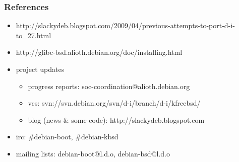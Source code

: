 \documentclass{beamer}
\begin{document}
\begin{frame}
  \frametitle{References}

  \begin{itemize}
  \item
    \text{[previous]}
    http://slackydeb.blogspot.com/2009/04/previous-attempts-to-port-d-i-to\_27.html
  \item
    \text{[sysinstall]}
    http://glibc-bsd.alioth.debian.org/doc/installing.html
  \end{itemize}

  \begin{itemize}
  \item
    project updates
    \begin{itemize}
    \item
      progress reports: soc-coordination@alioth.debian.org
    \item
      vcs: svn://svn.debian.org/svn/d-i/branch/d-i/kfreebsd/
    \item
      blog (news \& some code): http://slackydeb.blogspot.com
    \end{itemize}
  \item
    irc: \#debian-boot, \#debian-kbsd
  \item
    mailing lists: debian-boot@l.d.o, debian-bsd@l.d.o
  \end{itemize}

\end{frame}
\end{document}
